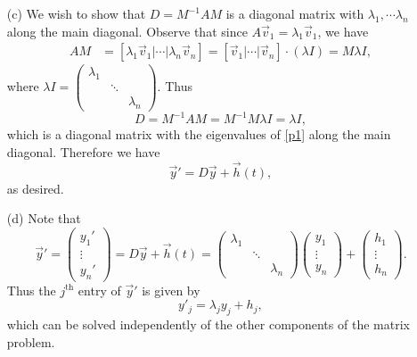 \documentclass[12pt]{report}
\begin{document}
\begin{solution}
\begin{enumerate}
        \item [(c)]
            We wish to show that $D = M^{-1}AM$ is a diagonal matrix with $\lambda_1, \cdots \lambda_n$ along the main diagonal. Observe that since $A\vec{v}_1 = \lambda_1 \vec{v}_1$, we have 
            \begin{align*}
                AM &= [ \lambda_1 \vec{v}_1 | \cdots | \lambda_n \vec{v}_n] = [\vec{v}_1 | \cdots | \vec{v}_n] \cdot (\lambda I) = M \lambda I,
            \end{align*}
            where $\lambda I = \begin{pmatrix}
                \lambda_{1} &  &  \\ 
                &  \ddots & \\ 
                &   & \lambda_{n} 
            \end{pmatrix}$. Thus
            \[ 
                D = M^{-1}AM = M^{-1}M\lambda I = \lambda I,
            \]
            which is a diagonal matrix with the eigenvalues of \ref{p1} along the main diagonal. Therefore we have 
            \[ 
                \vec{y}' = D\vec{y} + \vec{h}(t),
            \]
            as desired. 
        \item [(d)]
            Note that
            \[ 
                \vec{y}' = \begin{pmatrix}
                    y_1'\\
                    \vdots\\
                    y_n'
                \end{pmatrix}= D\vec{y} + \vec{h}(t) = \begin{pmatrix}
                    \lambda_{1} &  &  \\ 
                    &  \ddots & \\ 
                    &   & \lambda_{n} 
                \end{pmatrix}\begin{pmatrix}
                    y_1\\
                    \vdots\\
                    y_n
                \end{pmatrix} + \begin{pmatrix}
                    h_1\\
                    \vdots\\
                    h_n
                \end{pmatrix}.
            \]
            Thus the $j^{\text{th}}$ entry of $\vec{y}'$ is given by
            \[ 
                y'_j =\lambda_j y_j + h_j,
            \]
            which can be solved independently of the other components of the matrix problem. 


    \end{enumerate}
\end{solution}
\end{document}
